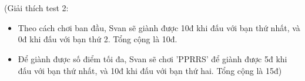  

 

(Giải thích test 2:
\begin{itemize}
	\item Theo cách chơi ban đầu, Svan sẽ giành được 10đ khi đấu với bạn thứ nhất, và 0đ khi đấu với bạn thứ 2. Tổng cộng là 10đ.
	\item Để giành được số điểm tối đa, Svan sẽ chơi 'PPRRS' để giành được 5đ khi đấu với bạn thứ nhất, và 10đ khi đấu với bạn thứ hai. Tổng cộng là 15đ)
\end{itemize}

 